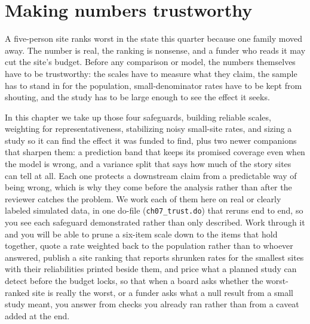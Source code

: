 \documentclass[
    a4paper,
    fontsize=10pt,
    twoside=true,
    numbers=noenddot,
]{kaobook}
\begin{document}


\chapter{Making numbers trustworthy}\label{ch:trust}

A five-person site ranks worst in the state this quarter because one family moved away. The number is real, the ranking is nonsense, and a funder who reads it may cut the site's budget. Before any comparison or model, the numbers themselves have to be trustworthy: the scales have to measure what they claim, the sample has to stand in for the population, small-denominator rates have to be kept from shouting, and the study has to be large enough to see the effect it seeks.

In this chapter we take up those four safeguards, building reliable scales, weighting for representativeness, stabilizing noisy small-site rates, and sizing a study so it can find the effect it was funded to find, plus two newer companions that sharpen them: a prediction band that keeps its promised coverage even when the model is wrong, and a variance split that says how much of the story sites can tell at all. Each one protects a downstream claim from a predictable way of being wrong, which is why they come before the analysis rather than after the reviewer catches the problem. We work each of them here on real or clearly labeled simulated data, in one do-file (\texttt{ch07\_trust.do}) that reruns end to end, so you see each safeguard demonstrated rather than only described. Work through it and you will be able to prune a six-item scale down to the items that hold together, quote a rate weighted back to the population rather than to whoever answered, publish a site ranking that reports shrunken rates for the smallest sites with their reliabilities printed beside them, and price what a planned study can detect before the budget locks, so that when a board asks whether the worst-ranked site is really the worst, or a funder asks what a null result from a small study meant, you answer from checks you already ran rather than from a caveat added at the end.
\end{document}
